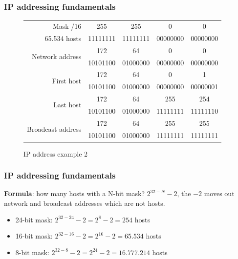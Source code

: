   \begin{frame}
    \frametitle{IP addressing fundamentals}
    \begin{figure}
        \centering
      \begin{tabular}{|r|cccc|}
        \hline
        Mask {\color{brown}/16} & {\color{brown}255} & {\color{brown}255} & {\color{fuchsia}0} & {\color{fuchsia}0} \\
        65.534 {\color{blue}hosts} & {\color{brown}11111111} & {\color{brown}11111111} & {\color{fuchsia}00000000} & {\color{fuchsia}00000000} \\ \hline
        \multirow{2}{*}{Network address} & \color{ForestGreen}172 & \color{ForestGreen}64 & \color{blue}0 & \color{blue}0 \\
        & \color{ForestGreen}10101100 & \color{ForestGreen}01000000 & \color{blue}00000000 & \color{blue}00000000 \\ \hline
        \multirow{2}{*}{First host} & \color{ForestGreen}172 & \color{ForestGreen}64 & \color{blue}0 & \color{blue}1 \\
        & \color{ForestGreen}10101100 & \color{ForestGreen}01000000 & \color{blue}00000000 & \color{blue}00000001 \\ \hline
        \multirow{2}{*}{Last host} & \color{ForestGreen}172 & \color{ForestGreen}64 & \color{blue}255 & \color{blue}254 \\
        & \color{ForestGreen}10101100 & \color{ForestGreen}01000000 & \color{blue}11111111 & \color{blue}11111110 \\ \hline
        \multirow{2}{*}{Broadcast address} & \color{ForestGreen}172 & \color{ForestGreen}64 & \color{blue}255 & \color{blue}255 \\
        & \color{ForestGreen}10101100 & \color{ForestGreen}01000000 & \color{blue}11111111 & \color{blue}11111111 \\ \hline
      \end{tabular}
      \caption{IP address example 2}
    \end{figure}
  \end{frame}

  \begin{frame}
    \frametitle{IP addressing fundamentals}
    \begin{block}{\textbf{Formula}: how many {\color{blue}hosts} with a N-bit mask?}
      $2^{32-N}-2$, the $-2$ moves out network and broadcast addresses which are not {\color{blue}hosts}.
      \begin{itemize}
        \item 24-bit {\color{brown}mask}: $2^{32-24}-2 = 2^{8}-2 = 254$ {\color{blue}hosts}
        \item 16-bit {\color{brown}mask}: $2^{32-16}-2 = 2^{16}-2 = 65.534$ {\color{blue}hosts}
        \item 8-bit {\color{brown}mask}: $2^{32-8}-2 = 2^{24}-2 = 16.777.214$ {\color{blue}hosts}
      \end{itemize}
    \end{block}
  \end{frame}


